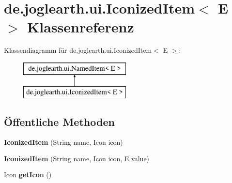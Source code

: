 \section{de.\-joglearth.\-ui.\-Iconized\-Item$<$ E $>$ Klassenreferenz}
\label{classde_1_1joglearth_1_1ui_1_1_iconized_item_3_01_e_01_4}
Klassendiagramm für de.\-joglearth.\-ui.\-Iconized\-Item$<$ E $>$\-:\begin{figure}[H]
\begin{center}
\leavevmode
\includegraphics[height=2.000000cm]{classde_1_1joglearth_1_1ui_1_1_iconized_item_3_01_e_01_4}
\end{center}
\end{figure}
\subsection*{Öffentliche Methoden}
\begin{DoxyCompactItemize}
\item 
{\bfseries Iconized\-Item} (String name, Icon icon)\label{classde_1_1joglearth_1_1ui_1_1_iconized_item_3_01_e_01_4_a5136753310485d97e5fdb7ca28cccb9b}

\item 
{\bfseries Iconized\-Item} (String name, Icon icon, E value)\label{classde_1_1joglearth_1_1ui_1_1_iconized_item_3_01_e_01_4_a577dd778a6b303e1f82c78f81e5d2e26}

\item 
Icon {\bfseries get\-Icon} ()\label{classde_1_1joglearth_1_1ui_1_1_iconized_item_3_01_e_01_4_a595020855ba5c660c1f9925d293e8f08}

\end{DoxyCompactItemize}
